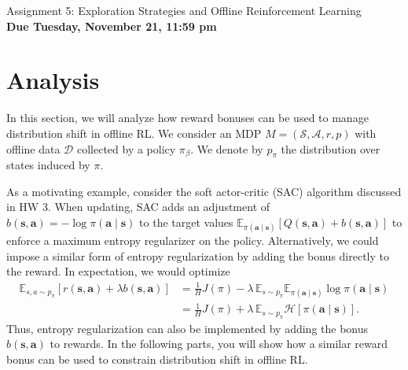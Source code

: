 \documentclass{article}
\def\D{\mathcal{D}}
\def\S{\mathcal{S}}
\def\A{\mathcal{A}}
\def\s{\mathbf{s}}
\def\a{\mathbf{a}}
\def\E{\mathbb{E}}
\def\pib{\pi_{\beta}}
\begin{document}

\begin{centering}
    {\Large Assignment 5: Exploration Strategies and Offline Reinforcement Learning} \\
    \vspace{.25cm}
    \textbf{Due Tuesday, November 21, 11:59 pm} \\
\end{centering}

\section{Analysis}
\label{sec:analysis}
\def\H{\mathcal{H}}

In this section, we will analyze how reward bonuses can be used to manage distribution shift in offline RL. We consider an MDP $M=(\S,\A,r,p)$ with offline data $\D$ collected by a policy $\pib$. We denote by $p_\pi$ the distribution over states induced by $\pi$.


As a motivating example, consider the soft actor-critic (SAC) algorithm discussed in HW 3. When updating, SAC adds an adjustment of $b(\s,\a)=-\log \pi(\a\mid\s)$ to the target values $\E_{\pi(\a\mid\s)}[Q(\s,\a)+b(\s,\a)]$ to enforce a maximum entropy regularizer on the policy. Alternatively, we could impose a similar form of entropy regularization by adding the bonus directly to the reward. In expectation, we would optimize \begin{align*}
  \E_{s,a\sim p_\pi} [r(\s,\a)+\lambda b(\s,\a)] 
  &= \tfrac1H J(\pi)-\lambda\,\E_{s\sim p_\pi}\E_{\pi(\a\mid\s)}\log \pi(\a\mid\s) \\
  &= \tfrac1H J(\pi)+\lambda\,\E_{s\sim p_\pi}\H[\pi(\a\mid\s)].
\end{align*}
Thus, entropy regularization can also be implemented by adding the bonus $b(\s,\a)$ to rewards. In the following parts, you will show how a similar reward bonus can be used to constrain distribution shift in offline RL.
\end{document}
